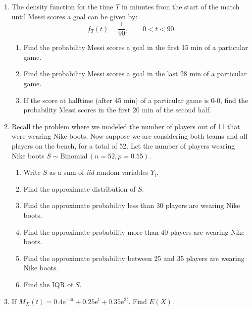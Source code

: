 \documentclass{article}
\newcommand{\e}{\mathrm{e}}		%
\newcommand{\follow}[1]{\sim \text{#1}\,}		%
\begin{document}
\begin{enumerate}
     \item The density function for the time $T$ in minutes from the start of the match until Messi scores a goal can be given by:
    \[f_T(t) = \frac{1}{90}, \quad\quad 0 < t < 90\]
    \begin{enumerate}
        \item Find the probability Messi scores a goal in the first 15 min of a particular game.\vspace{50pt}
        \item Find the probability Messi scores a goal in the last 28 min of a particular game.\vspace{50pt}
        \item If the score at halftime (after 45 min) of a particular game is 0-0, find the probability Messi scores in the first 20 min of the second half.\vspace{50pt}
    \end{enumerate}\bigskip
    
     \item Recall the problem where we modeled the number of players out of 11 that were wearing Nike boots. Now suppose we are considering both teams and all players on the bench, for a total of 52. Let the number of players wearing Nike boots $S \follow{Binomial}(n = 52, p = 0.55)$.\bigskip
     \begin{enumerate}
         \item Write $S$ as a sum of \textit{iid} random variables $Y_i$.\vspace{40pt}
         \item Find the approximate distribution of $S$.\vspace{50pt}
         \item Find the approximate probability less than 30 players are wearing Nike boots.\vspace{100pt}
         \item Find the approximate probability more than 40 players are wearing Nike boots.\vspace{100pt}
         \item Find the approximate probability between 25 and 35 players are wearing Nike boots.\vspace{100pt}
         \item Find the IQR of $S$.\vspace{100pt}
     \end{enumerate}
     
     \item If $M_X(t) = 0.4\e^{-3t} + 0.25\e^{t} + 0.35\e^{2t}$. Find $E(X)$.\vspace{30pt}

\end{enumerate}
\end{document}
